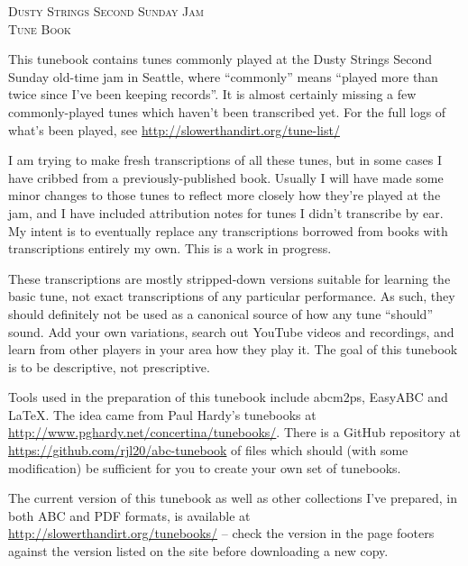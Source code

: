 \begin{titlepage}
\begin{center}

\textsc{\Large Dusty Strings Second Sunday Jam}\\[0.5cm]
\textsc{\LARGE Tune Book}\\[1cm]


\begin{minipage}{6in}
\setlength{\parindent}{15pt} %
\setlength{\parskip}{1em plus.4em minus.3em}

This tunebook contains tunes commonly played at the Dusty Strings
Second Sunday old-time jam in Seattle, where ``commonly'' means
``played more than twice since I've been keeping records''. It is
almost certainly missing a few commonly-played tunes which haven't
been transcribed yet. For the full logs of what's been played, see
\url{http://slowerthandirt.org/tune-list/}

I am trying to make fresh transcriptions of all these tunes, but in
some cases I have cribbed from a previously-published book. Usually I
will have made some minor changes to those tunes to reflect more
closely how they're played at the jam, and I have included attribution
notes for tunes I didn't transcribe by ear. My intent is to eventually
replace any transcriptions borrowed from books with transcriptions
entirely my own. This is a work in progress.

These transcriptions are mostly stripped-down versions suitable for
learning the basic tune, not exact transcriptions of any particular
performance. As such, they should definitely not be used as a
canonical source of how any tune ``should'' sound. Add your own
variations, search out YouTube videos and recordings, and learn from
other players in your area how they play it. The goal of this tunebook
is to be descriptive, not prescriptive.

Tools used in the preparation of this tunebook include abcm2ps,
EasyABC and {\LaTeX}. The idea came from Paul Hardy's tunebooks at
\url{http://www.pghardy.net/concertina/tunebooks/}.  There is a GitHub
repository at \url{https://github.com/rjl20/abc-tunebook} of files
which should (with some modification) be sufficient for you to create
your own set of tunebooks.

The current version of this tunebook as well as other collections I've
prepared, in both ABC and PDF formats, is available at
\url{http://slowerthandirt.org/tunebooks/} -- check the version in the
page footers against the version listed on the site before downloading
a new copy.


\end{minipage}
\end{center}
\end{titlepage}
